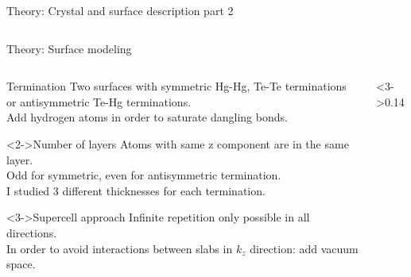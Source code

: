 \begin{frame}{Theory: Crystal and surface description part 2}
\begin{columns}
\begin{column}
		\end{column}
	\end{columns}
\end{frame}

\begin{frame}{Theory: Surface modeling}
	\begin{columns}
		\begin{column}{.86\linewidth}
			\begin{block}{Termination}
				Two surfaces with symmetric Hg-Hg, Te-Te terminations or antisymmetric Te-Hg terminations.\\
				Add hydrogen atoms in order to saturate dangling bonds. 
			\end{block}
			\begin{block}<2->{Number of layers}
				Atoms with same z component are in the same layer. \\
				Odd for symmetric, even for antisymmetric termination.\\
				I studied 3 different thicknesses for each termination.
			\end{block}
			\begin{block}<3->{Supercell approach}
				Infinite repetition only possible in all directions.\\
				In order to avoid interactions between slabs in $k_z$ direction: add vacuum space. 
			\end{block}
		\end{column}
		\begin{column}<3->{0.14\linewidth} 
			\centering

\end{column}
\end{columns}
\end{frame}
